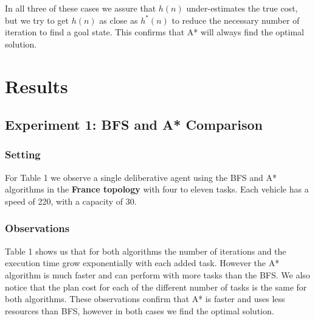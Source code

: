 \documentclass[11pt]{article}
\begin{document}
In all three of these cases we assure that $h(n)$ under-estimates the true cost, but we try to get $h(n)$ as close as $h^*(n)$ to reduce the necessary number of iteration to find a goal state. This confirms that A* will always find the optimal solution.

\section{Results}

\subsection{Experiment 1: BFS and A* Comparison}

\subsubsection{Setting}
For Table 1 we observe a single deliberative agent using the BFS and A* algorithms in the \textbf{France topology} with four to eleven tasks. Each vehicle has a speed of 220, with a capacity of 30.

\subsubsection{Observations}

\indent \indent Table 1 shows us that for both algorithms the number of iterations and the execution time grow exponentially with each added task. However the A* algorithm is much faster and can perform with more tasks than the BFS. We also notice that the plan cost for each of the different number of tasks is the same for both algorithms. These observations confirm that A* is faster and uses less resources than BFS, however in both cases we find the optimal solution.
\end{document}
